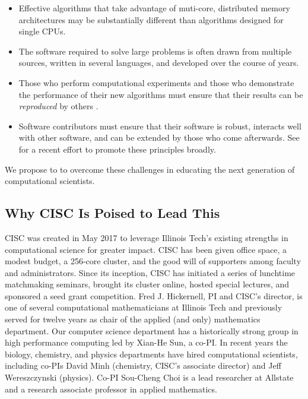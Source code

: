 \documentclass[11pt]{NSFamsart}
\begin{document}
\begin{itemize}

\item Effective algorithms that take advantage of muti-core, distributed memory architectures may be substantially different than algorithms designed for single CPUs.

\item The software required to solve large problems is often drawn from multiple sources, written in several languages, and developed over the course of years.

\item Those who perform computational experiments and those who demonstrate the performance of their new algorithms must ensure that their results can be \emph{reproduced} by others \cite{Pen11}.  

\item Software contributors must ensure that their software is robust, interacts well with other software, and can be extended by those who come afterwards.  See \cite{BSS18} for a recent effort to promote these principles broadly.

\end{itemize}

We propose to to overcome these challenges in educating the next generation of computational scientists.

\subsection*{Why CISC Is Poised to Lead This}
CISC was created in May 2017 to leverage Illinois Tech’s existing strengths in computational science for greater impact.  CISC has been given office space, a modest budget, a 256-core cluster, and the good will of supporters among faculty and administrators.  Since its inception, CISC has initiated a series of lunchtime matchmaking seminars, brought its cluster online, hosted special lectures, and sponsored a seed grant competition. Fred J. Hickernell, PI and CISC’s director, is one of several computational mathematicians at Illinois Tech and previously served for twelve years as chair of the applied (and only) mathematics department.  Our computer science department has a historically strong group in high performance computing led by Xian-He Sun, a co-PI.  In recent years the biology, chemistry, and physics departments have hired computational scientists, including co-PIs David Minh (chemistry, CISC's associate director) and Jeff Wereszczynski (physics).  Co-PI Sou-Cheng Choi is a lead researcher at Allstate and a research associate professor in applied mathematics.
\end{document}

